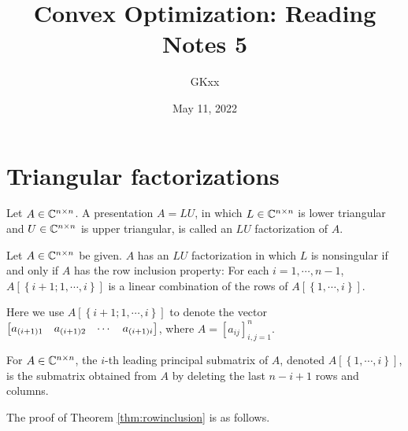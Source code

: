 \documentclass[12pt]{article}
\title{Convex Optimization: Reading Notes 5}
\author{GKxx}
\date{May 11, 2022}
\begin{document}
\maketitle

\section{Triangular factorizations}

\begin{definition}[\(LU\) factorization]
    Let \(A\in\mathbb C^{n\times n}\). A presentation \(A=LU\), in which \(L\in\mathbb C^{n\times n}\) is lower triangular and \(U\in\mathbb C^{n\times n}\) is upper triangular, is called an \textnormal{\(LU\) factorization} of \(A\).
\end{definition}

\begin{theorem}\label{thm:rowinclusion}
    Let \(A\in\mathbb C^{n\times n}\) be given. \(A\) has an \(LU\) factorization in which \(L\) is nonsingular if and only if \(A\) has the \textnormal{row inclusion property}: For each \(i=1,\cdots,n-1\), \(A\left[\left\{i+1;1,\cdots,i\right\}\right]\) is a linear combination of the rows of \(A\left[\left\{1,\cdots,i\right\}\right]\).
\end{theorem}

Here we use \(A\left[\left\{i+1;1,\cdots,i\right\}\right]\) to denote the vector \(\begin{bmatrix}a_{(i+1)1} & a_{(i+1)2} & \cdots & a_{(i+1)i}\end{bmatrix}\), where \(A=\left[a_{ij}\right]_{i,j=1}^n\).

\begin{remark}
    For \(A\in\mathbb C^{n\times n}\), the \(i\)-th \textnormal{leading principal submatrix} of \(A\), denoted \(A\left[\left\{1,\cdots,i\right\}\right]\), is the submatrix obtained from \(A\) by deleting the last \(n-i+1\) rows and columns.
\end{remark}

The proof of Theorem \ref{thm:rowinclusion} is as follows.
\end{document}
